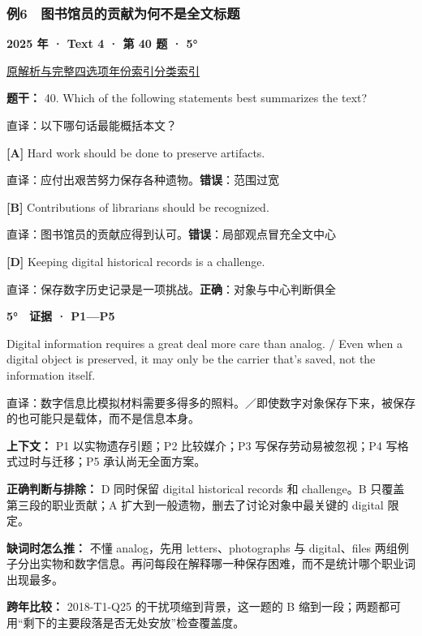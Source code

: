 \documentclass[11pt,a4paper]{article}
\begin{document}
\subsubsection{例6　图书馆员的贡献为何不是全文标题}\label{case-2025-T4-Q40}
\noindent\textbf{2025 年 · Text 4 · 第 40 题 · 5°}\par\noindent \href{https://zj139.github.io/math-notes/english/2d3b4c55b3c8d254540a4e16/\#q40}{原解析与完整四选项}\quad \hyperref[idx-2025-T4-Q40]{年份索引}\quad \hyperref[class-R03]{分类索引}\par\smallskip
\noindent\textbf{题干：} 40. Which of the following statements best summarizes the text?\par\smallskip
直译：以下哪句话最能概括本文？

\noindent\textbf{[A]} Hard work should be done to preserve artifacts.\par\nopagebreak
\noindent 直译：应付出艰苦努力保存各种遗物。\quad\textbf{错误}：范围过宽\par\smallskip
{}\noindent\textbf{[B]} Contributions of librarians should be recognized.\par\nopagebreak
\noindent 直译：图书馆员的贡献应得到认可。\quad\textbf{错误}：局部观点冒充全文中心\par\smallskip
{}\noindent\textbf{[D]} Keeping digital historical records is a challenge.\par\nopagebreak
\noindent 直译：保存数字历史记录是一项挑战。\quad\textbf{正确}：对象与中心判断俱全\par\smallskip
\begin{evidence}\textbf{5°　证据 · P1—P5}\par Digital information requires a great deal more care than analog. / Even when a digital object is preserved, it may only be the carrier that’s saved, not the information itself.\par 直译：数字信息比模拟材料需要多得多的照料。／即使数字对象保存下来，被保存的也可能只是载体，而不是信息本身。\end{evidence}
\noindent\textbf{上下文：} P1 以实物遗存引题；P2 比较媒介；P3 写保存劳动易被忽视；P4 写格式过时与迁移；P5 承认尚无全面方案。\par\smallskip
\noindent\textbf{正确判断与排除：} D 同时保留 digital historical records 和 challenge。B 只覆盖第三段的职业贡献；A 扩大到一般遗物，删去了讨论对象中最关键的 digital 限定。\par\smallskip
\noindent\textbf{缺词时怎么推：} 不懂 analog，先用 letters、photographs 与 digital、files 两组例子分出实物和数字信息。再问每段在解释哪一种保存困难，而不是统计哪个职业词出现最多。\par\smallskip
\noindent\textbf{跨年比较：} 2018-T1-Q25 的干扰项缩到背景，这一题的 B 缩到一段；两题都可用“剩下的主要段落是否无处安放”检查覆盖度。\par\smallskip
\clearpage
\end{document}

